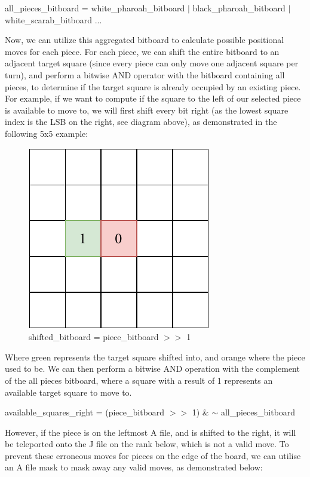 \documentclass[../main/main.tex]{subfiles}
\begin{document}
\begin{center}
all\_pieces\_bitboard = white\_pharoah\_bitboard $\vert$  black\_pharoah\_bitboard $\vert$ white\_scarab\_bitboard ...
\end{center}

Now, we can utilize this aggregated bitboard to calculate possible positional moves for each piece.
For each piece, we can shift the entire bitboard to an adjacent target square (since every piece can only move one adjacent square per turn), and perform a bitwise AND operator with the bitboard containing all pieces, to determine if the target square is already occupied by an existing piece. For example, if we want to compute if the square to the left of our selected piece is available to move to, we will first shift every bit right (as the lowest square index is the LSB on the right, see diagram above), as demonstrated in the following 5x5 example:

\begin{figure}[H]
    \centering
    \includegraphics[width=0.4\columnwidth]{../design/assets/bitboard_shifted.pdf}
    \caption{shifted\_bitboard = piece\_bitboard $>>$ 1}
    \label{fig:bitboard-shifted}
\end{figure}

Where green represents the target square shifted into, and orange where the piece used to be. We can then perform a bitwise AND operation with the complement of the all pieces bitboard, where a square with a result of 1 represents an available target square to move to.

\begin{center}
available\_squares\_right = (piece\_bitboard $>>$ 1) \& $\sim$ all\_pieces\_bitboard
\end{center}

However, if the piece is on the leftmost A file, and is shifted to the right, it will be teleported onto the J file on the rank below, which is not a valid move. To prevent these erroneous moves for pieces on the edge of the board, we can utilise an A file mask to mask away any valid moves, as demonstrated below:
\end{document}
